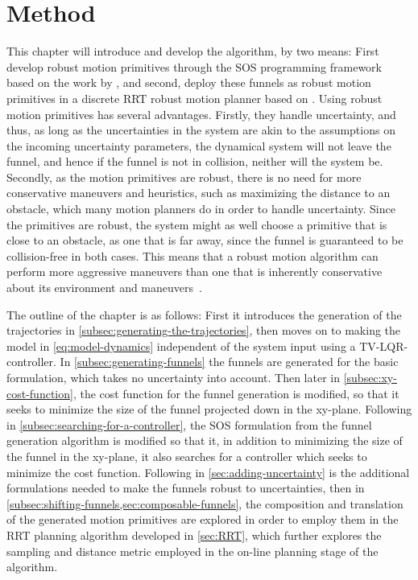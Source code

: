 \chapter{Method}
\label{chp:method}

This chapter will introduce and develop the \rrtfunnel{} algorithm, by two
means: First develop robust motion primitives through the \ac{SOS} programming
framework based on the work by \textcite{majumdarFunnelLibrariesRealtime2017},
and second, deploy these funnels as robust motion primitives in a discrete
\ac{RRT} robust motion planner based on \textcite{Lav06}. Using robust motion
primitives has several advantages. Firstly, they handle uncertainty, and thus,
as long as the uncertainties in the system are akin to the assumptions on the
incoming uncertainty parameters, the dynamical system will not leave the funnel,
and hence if the funnel is not in collision, neither will the system be.
Secondly, as the motion primitives are robust, there is no need for more
conservative maneuvers and heuristics, such as maximizing the distance to an
obstacle, which many motion planners do in order to handle uncertainty. Since
the primitives are robust, the system might as well choose a primitive that is
close to an obstacle, as one that is far away, since the funnel is guaranteed to
be collision-free in both cases. This means that a robust motion algorithm can
perform more aggressive maneuvers than one that is inherently conservative about
its environment and maneuvers~\cite{singhRobustOnlineMotion2017}.

The outline of the chapter is as follows: First it introduces the generation of
the trajectories in \cref{subsec:generating-the-trajectories}, then moves on to
making the model in \cref{eq:model-dynamics} independent of the system input
using a \ac{TV-LQR}-controller. In \cref{subsec:generating-funnels} the funnels
are generated for the basic formulation, which takes no uncertainty into
account. Then later in \cref{subsec:xy-cost-function}, the cost function for the
funnel generation is modified, so that it seeks to minimize the size of the
funnel projected down in the xy-plane. Following in
\cref{subsec:searching-for-a-controller}, the \ac{SOS} formulation from the
funnel generation algorithm is modified so that it, in addition to minimizing
the size of the funnel in the xy-plane, it also searches for a controller which
seeks to minimize the cost function. Following in \cref{sec:adding-uncertainty}
is the additional formulations needed to make the funnels robust to
uncertainties, then in \cref{subsec:shifting-funnels,sec:composable-funnels},
the composition and translation of the generated motion primitives are explored
in order to employ them in the \ac{RRT} planning algorithm developed in
\cref{sec:RRT}, which further explores the sampling and distance metric employed
in the on-line planning stage of the algorithm.

